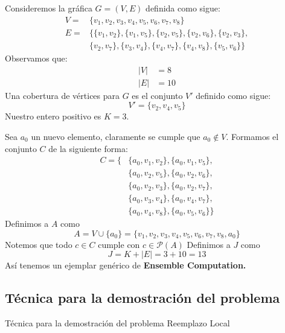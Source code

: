 \documentclass[spanish, xcolor=dvipsnames, aspectratio=169]{beamer}
\newcommand{\subsectiontitle}{}
\begin{document}
\subsection{\subsectiontitle}
\begin{frame}{\subsectiontitle}
Consideremos la gráfica \(G = \left(V, E\right)\) definida como sigue:
\begin{align*}
    V = &\{v_{1}, v_{2}, v_{3}, v_{4}, v_{5}, v_{6}, v_{7}, v_{8}\} \\
    E = &\{\{v_{1}, v_{2}\}, \{v_{1}, v_{5}\}, \{v_{2}, v_{5}\}, \{v_{2}, v_{6}\}, \{v_{2}, v_{3}\}, \\
        &\{v_{2}, v_{7}\}, \{v_{3}, v_{4}\}, \{v_{4}, v_{7}\}, \{v_{4}, v_{8}\}, \{v_{5}, v_{6}\}\}
\end{align*}
Observamos que:
\begin{align*}
    |V| &= 8 \\
    |E| &= 10
\end{align*}
Una cobertura de vértices para \(G\) es el conjunto \(V'\) definido como sigue:
    \[
        V' = \{v_{2}, v_{4}, v_{5}\}  
    \]
Nuestro entero positivo es \(K = 3\).
\end{frame}
\begin{frame}{\subsectiontitle}
    Sea \(a_0\) un nuevo elemento, claramente se cumple que \(a_{0} \notin V\). Formamos el conjunto \(C\) de la siguiente forma:
    \begin{align*}
        C = \{ &\{a_{0}, v_{1}, v_{2}\}, \{a_{0}, v_{1}, v_{5}\}, \\
               &\{a_{0}, v_{2}, v_{5}\}, \{a_{0}, v_{2}, v_{6}\}, \\
               &\{a_{0}, v_{2}, v_{3}\}, \{a_{0}, v_{2}, v_{7}\}, \\
               &\{a_{0}, v_{3}, v_{4}\}, \{a_{0}, v_{4}, v_{7}\}, \\
               &\{a_{0}, v_{4}, v_{8}\}, \{a_{0}, v_{5}, v_{6}\}\}
    \end{align*}
    Definimos a \(A\) como
    \[
        A = V \cup \{a_{0}\} = \{v_{1}, v_{2}, v_{3}, v_{4}, v_{5}, v_{6}, v_{7}, v_{8}, a_0\}
    \]
    Notemos que todo \(c \in C\) cumple con \(c \in \mathcal{P}\left(A\right)\)
    \newline 
    Definimos a \(J\) como
    \[
        J = K + |E| = 3 + 10 = 13
    \]
    Así tenemos un ejemplar genérico de \textbf{Ensemble Computation.}
\end{frame}
\renewcommand{\subsectiontitle}{Técnica para la demostración del problema}
\subsection{\subsectiontitle}
\begin{frame}{\subsectiontitle}
Reemplazo Local
\end{frame}
\renewcommand{\subsectiontitle}{Aplicación en la vida real}
\end{document}
